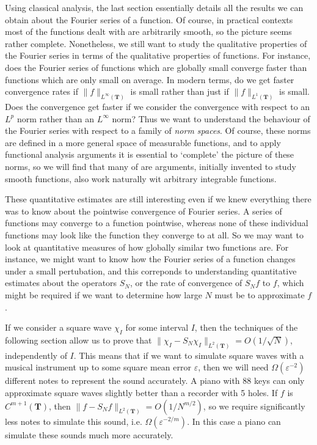 Using classical analysis, the last section essentially details all the results we can obtain about the Fourier series of a function. Of course, in practical contexts most of the functions dealt with are arbitrarily smooth, so the picture seems rather complete. Nonetheless, we still want to study the qualitative properties of the Fourier series in terms of the qualitative properties of functions. For instance, does the Fourier series of functions which are globally small converge faster than functions which are only small on average. In modern terms, do we get faster convergence rates if $\| f \|_{L^\infty(\mathbf{T})}$ is small rather than just if $\| f \|_{L^1(\mathbf{T})}$ is small. Does the convergence get faster if we consider the convergence with respect to an $L^p$ norm rather than an $L^\infty$ norm? Thus we want to understand the behaviour of the Fourier series with respect to a family of \emph{norm spaces}. Of course, these norms are defined in a more general space of measurable functions, and to apply functional analysis arguments it is essential to `complete' the picture of these norms, so we will find that many of are arguments, initially invented to study smooth functions, also work naturally wit arbitrary integrable functions.

These quantitative estimates are still interesting even if we knew everything there was to know about the pointwise convergence of Fourier series. A series of functions may converge to a function pointwise, whereas none of these individual functions may look like the function they converge to at all. So we may want to look at quantitative measures of how globally similar two functions are. For instance, we might want to know how the Fourier series of a function changes under a small pertubation, and this correponds to understanding quantitative estimates about the operators $S_N$, or the rate of convergence of $S_N f$ to $f$, which might be required if we want to determine how large $N$ must be to approximate $f$.

\begin{example}
	If we consider a square wave $\chi_I$ for some interval $I$, then the techniques of the following section allow us to prove that $\| \chi_I - S_N \chi_I \|_{L^2(\mathbf{T})} = O(1/\sqrt{N})$, independently of $I$. This means that if we want to simulate square waves with a musical instrument up to some square mean error $\varepsilon$, then we will need $\Omega(\varepsilon^{-2})$ different notes to represent the sound accurately. A piano with 88 keys can only approximate square waves slightly better than a recorder with 5 holes. If $f$ is $C^{m+1}(\mathbf{T})$, then $\| f - S_N f \|_{L^2(\mathbf{T})} = O(1/N^{m/2})$, so we require significantly less notes to simulate this sound, i.e. $\Omega(\varepsilon^{-2/m})$. In this case a piano can simulate these sounds much more accurately.
\end{example}

